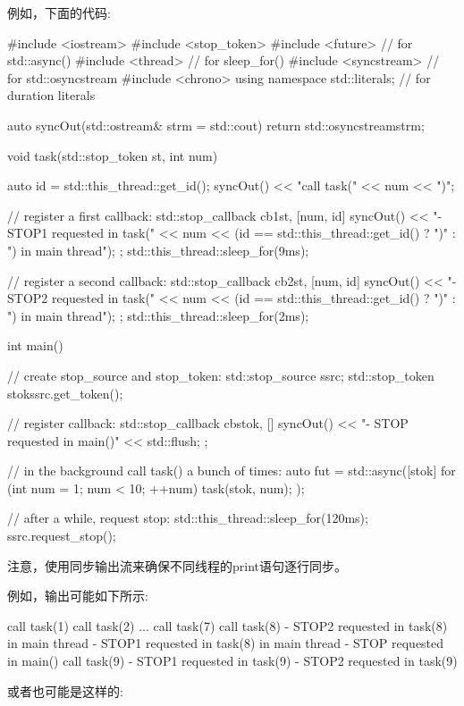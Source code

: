 例如，下面的代码:


\begin{cpp}
#include <iostream>
#include <stop_token>
#include <future> // for std::async()
#include <thread> // for sleep_for()
#include <syncstream> // for std::osyncstream
#include <chrono>
using namespace std::literals; // for duration literals

auto syncOut(std::ostream& strm = std::cout) {
	return std::osyncstream{strm};
}

void task(std::stop_token st, int num)
{
	auto id = std::this_thread::get_id();
	syncOut() << "call task(" << num << ")\n";
	
	// register a first callback:
	std::stop_callback cb1{st, [num, id]{
		syncOut() << "- STOP1 requested in task(" << num
			<< (id == std::this_thread::get_id() ? ")\n"
												: ") in main thread\n");
	}};
	std::this_thread::sleep_for(9ms);
	
	// register a second callback:
	std::stop_callback cb2{st, [num, id]{
		syncOut() << "- STOP2 requested in task(" << num
			<< (id == std::this_thread::get_id() ? ")\n"
												: ") in main thread\n");
	}};
	std::this_thread::sleep_for(2ms);
}
	
int main()
{
	// create stop_source and stop_token:
	std::stop_source ssrc;
	std::stop_token stok{ssrc.get_token()};
	
	// register callback:
	std::stop_callback cb{stok, []{
			syncOut() << "- STOP requested in main()\n" << std::flush;
	}};

	// in the background call task() a bunch of times:
	auto fut = std::async([stok] {
							for (int num = 1; num < 10; ++num) {
								task(stok, num);
							}
						});
	
	// after a while, request stop:
	std::this_thread::sleep_for(120ms);
	ssrc.request_stop();
}
\end{cpp}

注意，使用同步输出流来确保不同线程的print语句逐行同步。

例如，输出可能如下所示:

\begin{shell}
call task(1)
call task(2)
...
call task(7)
call task(8)
- STOP2 requested in task(8) in main thread
- STOP1 requested in task(8) in main thread
- STOP requested in main()
call task(9)
- STOP1 requested in task(9)
- STOP2 requested in task(9)
\end{shell}


或者也可能是这样的:

